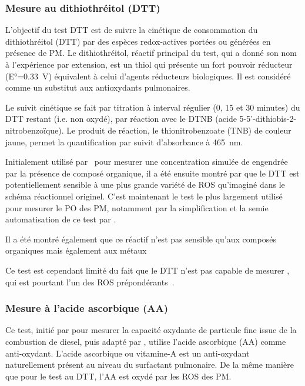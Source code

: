 \subsubsection{Mesure au dithiothréitol (DTT)}%
\label{ssub:mesure_au_dtt}

L’objectif du test DTT est de suivre la cinétique de consommation du dithiothréitol (DTT)
par des espèces redox-actives portées ou générées en présence de PM. Le dithiothréitol,
réactif principal du test, qui a donné son nom à l’expérience par extension, est un thiol
qui présente un fort pouvoir réducteur (E°=\SI{0.33}{\V}) équivalent à celui d’agents réducteurs
biologiques. Il est considéré comme un substitut aux antioxydants pulmonaires.

Le suivit cinétique se fait par titration à interval régulier (0, 15 et 30 minutes) du DTT
restant (i.e. non oxydé), par réaction avec le DTNB (acide
5-5'-dithiobis-2-nitrobenzoïque). Le produit de réaction, le thionitrobenzoate (TNB) de
couleur jaune, permet la quantification par suivit d'absorbance à \SI{465}{nm}.

Initialement utilisé par~\textcite{choRedox2005} pour mesurer une concentration simulée de
 engendrée par la présence de composé organique, il a été ensuite montré par
\textcite{beiReaction2014} que le DTT est potentiellement sensible à une plus grande
variété de ROS qu'imaginé dans le schéma réactionnel originel. C'est maintenant le test le
plus largement utilisé pour mesurer le PO des PM, notamment par la simplification et
la semie automatisation de ce test par \textcite{fangSemiautomated2015}.

Il a été montré également que ce réactif n'est pas sensible qu'aux composés organiques
mais également aux métaux~\autocite{charrierDithiothreitol2012,linGeneration2011}

Ce test est cependant limité du fait que le DTT n'est pas capable de mesurer
, qui est pourtant l'un des ROS prépondérants~\autocite{xiongRethinking2017}.

\subsubsection{Mesure à l'acide ascorbique (AA)}%
\label{ssub:mesure_à_l_aa}

Ce test, initié par \textcite{zielinskiModeling1999} pour mesurer la capacité oxydante de
particule fine issue de la combustion de diesel, puis adapté par
\textcite{mudwayVitro2004,ayresEvaluating2008}, utilise l'acide ascorbique (AA) comme
anti-oxydant.
L'acide ascorbique ou vitamine-A est un anti-oxydant naturellement présent au niveau du
surfactant pulmonaire. De la même manière que pour le test au DTT, l'AA est oxydé par
les ROS des PM.

